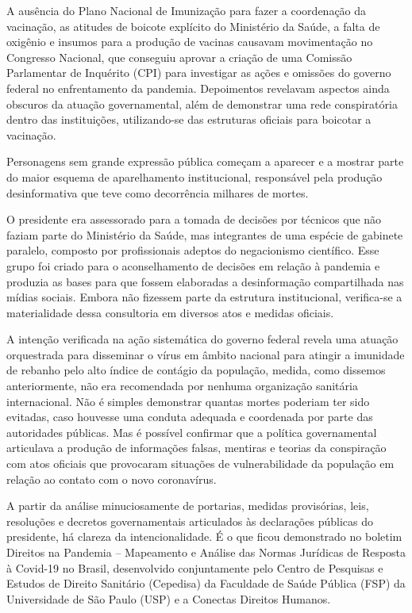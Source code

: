 A ausência do Plano Nacional de Imunização para fazer a coordenação da
vacinação, as atitudes de boicote explícito do Ministério da Saúde, a
falta de oxigênio e insumos para a produção de vacinas causavam
movimentação no Congresso Nacional, que conseguiu aprovar a criação de
uma Comissão Parlamentar de Inquérito (CPI) para investigar as ações e
omissões do governo federal no enfrentamento da pandemia. Depoimentos
revelavam aspectos ainda obscuros da atuação governamental, além de
demonstrar uma rede conspiratória dentro das instituições, utilizando-se
das estruturas oficiais para boicotar a vacinação.

Personagens sem grande expressão pública começam a aparecer e a mostrar
parte do maior esquema de aparelhamento institucional, responsável pela
produção desinformativa que teve como decorrência milhares de mortes.

O presidente era assessorado para a tomada de decisões por técnicos que
não faziam parte do Ministério da Saúde, mas integrantes de uma espécie
de gabinete paralelo, composto por profissionais adeptos do negacionismo
científico. Esse grupo foi criado para o aconselhamento de decisões em
relação à pandemia e produzia as bases para que fossem elaboradas a
desinformação compartilhada nas mídias sociais. Embora não fizessem
parte da estrutura institucional, verifica-se a materialidade dessa
consultoria em diversos atos e medidas oficiais.

A intenção verificada na ação sistemática do governo federal revela uma
atuação orquestrada para disseminar o vírus em âmbito nacional para
atingir a imunidade de rebanho pelo alto índice de contágio da
população, medida, como dissemos anteriormente, não era recomendada por
nenhuma organização sanitária internacional. Não é simples demonstrar
quantas mortes poderiam ter sido evitadas, caso houvesse uma conduta
adequada e coordenada por parte das autoridades públicas. Mas é possível
confirmar que a política governamental articulava a produção de
informações falsas, mentiras e teorias da conspiração com atos oficiais
que provocaram situações de vulnerabilidade da população em relação ao
contato com o novo coronavírus.

A partir da análise minuciosamente de portarias, medidas provisórias,
leis, resoluções e decretos governamentais articulados às declarações
públicas do presidente, há clareza da intencionalidade. É o que ficou
demonstrado no boletim Direitos na Pandemia -- Mapeamento e Análise das
Normas Jurídicas de Resposta à Covid-19 no Brasil, desenvolvido
conjuntamente pelo Centro de Pesquisas e Estudos de Direito Sanitário
(Cepedisa) da Faculdade de Saúde Pública (FSP) da Universidade de São
Paulo (USP) e a Conectas Direitos Humanos.

